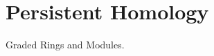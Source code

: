 \documentclass[11pt,a4paper]{report}
\begin{document}

                
             \chapter{Persistent Homology}
               
              
              Graded Rings and Modules. \\
               
\end{document}
